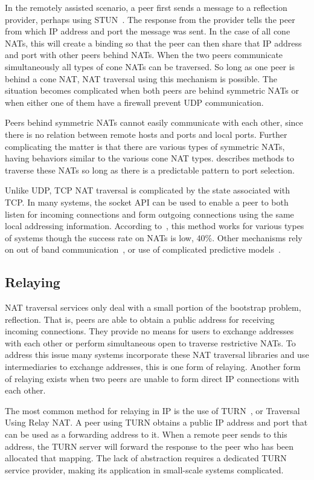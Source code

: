 \documentclass[conference]{IEEEtran}
\begin{document}
In the remotely assisted scenario, a peer first sends a message to a reflection
provider, perhaps using STUN~\cite{stun_rfc}.  The response from the provider
tells the peer from which IP address and port the message was sent.  In the
case of all cone NATs, this will create a binding so that the peer can then
share that IP address and port with other peers behind NATs.  When the two
peers communicate simultaneously all types of cone NATs can be traversed.  So
long as one peer is behind a cone NAT, NAT traversal using this mechanism is
possible.  The situation becomes complicated when both peers are behind
symmetric NATs or when either one of them have a firewall prevent UDP
communication.  

Peers behind symmetric NATs cannot easily communicate with each other, since
there is no relation between remote hosts and ports and local ports.  Further
complicating the matter is that there are various types of symmetric NATs,
having behaviors similar to the various cone NAT types.  \cite{ice} describes
methods to traverse these NATs so long as there is a predictable pattern to
port selection.  

Unlike UDP, TCP NAT traversal is complicated by the state associated with TCP.
In many systems, the socket API can be used to enable a peer to both listen for
incoming connections and form outgoing connections using the same local
addressing information.  According to~\cite{ice-tcp}, this method works for
various types of systems though the success rate on NATs is low, 40\%.  Other
mechanisms rely on out of band communication~\cite{pvc}, or use of complicated
predictive models~\cite{tcp-hole-punching}.

\subsection{Relaying}
\label{relay}

NAT traversal services only deal with a small portion of the bootstrap problem,
reflection.  That is, peers are able to obtain a public address for receiving
incoming connections.  They provide no means for users to exchange addresses
with each other or perform simultaneous open to traverse restrictive NATs.  To
address this issue many systems incorporate these NAT traversal libraries and
use intermediaries to exchange addresses, this is one form of relaying.
Another form of relaying exists when two peers are unable to form direct IP
connections with each other.

The most common method for relaying in IP is the use of TURN~\cite{turn}, or
Traversal Using Relay NAT.  A peer using TURN obtains a public IP address and
port that can be used as a forwarding address to it.  When a remote peer sends
to this address, the TURN server will forward the response to the peer who has
been allocated that mapping.  The lack of abstraction requires a dedicated TURN
service provider, making its application in small-scale systems complicated.  
\end{document}
